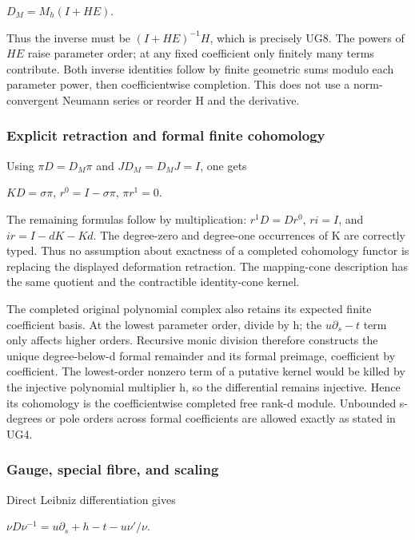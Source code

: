 \(D_M=M_h(I+HE)\).

Thus the inverse must be \((I+HE)^{-1}H\), which is precisely UG8. The powers of \(HE\) raise parameter order; at any fixed coefficient only finitely many terms contribute. Both inverse identities follow by finite geometric sums modulo each parameter power, then coefficientwise completion. This does not use a norm-convergent Neumann series or reorder H and the derivative.

\subsubsection{Explicit retraction and formal finite cohomology}\label{endpoint-f1_unit_gauge_review--explicit-retraction-and-formal-finite-cohomology}

Using \(\pi D=D_M\pi\) and \(J D_M=D_M J=I\), one gets

\(KD=\sigma\pi\), \(r^0=I-\sigma\pi\), \(\pi r^1=0\).

The remaining formulas follow by multiplication: \(r^1D=Dr^0\), \(ri=I\), and \(ir=I-dK-Kd\). The degree-zero and degree-one occurrences of K are correctly typed. Thus no assumption about exactness of a completed cohomology functor is replacing the displayed deformation retraction. The mapping-cone description has the same quotient and the contractible identity-cone kernel.

The completed original polynomial complex also retains its expected finite coefficient basis. At the lowest parameter order, divide by h; the \(u\partial_s-t\) term only affects higher orders. Recursive monic division therefore constructs the unique degree-below-d formal remainder and its formal preimage, coefficient by coefficient. The lowest-order nonzero term of a putative kernel would be killed by the injective polynomial multiplier h, so the differential remains injective. Hence its cohomology is the coefficientwise completed free rank-d module. Unbounded s-degrees or pole orders across formal coefficients are allowed exactly as stated in UG4.

\subsubsection{Gauge, special fibre, and scaling}\label{endpoint-f1_unit_gauge_review--gauge-special-fibre-and-scaling}

Direct Leibniz differentiation gives

\(\nu D\nu^{-1}=u\partial_s+h-t-u\nu'/\nu\).


